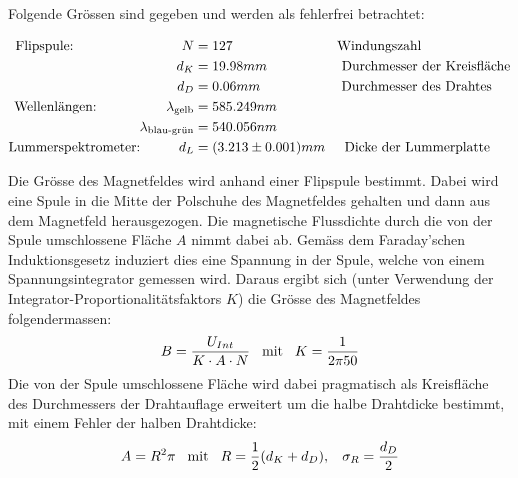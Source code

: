 \documentclass[12pt,a4paper]{article} %
\begin{document}
Folgende Grössen sind gegeben und werden als fehlerfrei betrachtet:
\begin{footnotesize} \begin{singlespace}
		\begin{align}
		\text{Flipspule:} \hspace{2.8 cm} N &=127 \hspace{2.7cm} \text{Windungszahl} \\
			d_K &= 19.98 mm \hspace{1.93cm}\text{Durchmesser der Kreisfläche} \\
			d_D &= 0.06 mm \hspace{2.1cm}\text{Durchmesser des Drahtes} \\
		\text{Wellenlängen:} \hspace{1.8 cm} \lambda_{\text{gelb}} &= 585.249 nm \\
		\lambda_{\text{blau-grün}} &= 540.056 nm \label{Wellenlängen} \\
		\text{Lummerspektrometer:} \hspace{1cm}d_L &= (3.213\pm0.001)mm \hspace{0.5cm}\text{Dicke der Lummerplatte}
		\end{align} \end{singlespace} \end{footnotesize}

Die Grösse des Magnetfeldes wird anhand einer Flipspule bestimmt. Dabei wird eine Spule in die Mitte der Polschuhe des Magnetfeldes gehalten und dann aus dem Magnetfeld herausgezogen. Die magnetische Flussdichte durch die von der Spule umschlossene Fläche $A$ nimmt dabei ab. Gemäss dem Faraday'schen Induktionsgesetz induziert dies eine Spannung in der Spule, welche von einem Spannungsintegrator gemessen wird. Daraus ergibt sich (unter Verwendung der Integrator-Proportionalitätsfaktors $K$) die Grösse des Magnetfeldes folgendermassen:
\begin{align}
B = \frac{U_{Int}}{K\cdot A\cdot N} \hspace{0.3cm} \text{mit} \hspace{0.3cm} K=\frac{1}{2\pi 50}
\end{align}
Die von der Spule umschlossene Fläche wird dabei pragmatisch als Kreisfläche des Durchmessers der Drahtauflage erweitert um die halbe Drahtdicke bestimmt, mit einem Fehler der halben Drahtdicke:
\begin{align}
A = R^2\pi \hspace{0.3cm} \text{mit} \hspace{0.3cm} R = \frac{1}{2}(d_K+d_D), \hspace{0.3cm} \sigma_R = \frac{d_D}{2}
\end{align}
\end{document}
